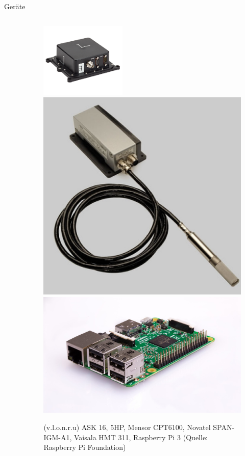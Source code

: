 \documentclass[ucs,9pt]{beamer}
\begin{document}
\begin{frame}{Geräte}
\begin{columns}
\begin{column}[t]{0.45\textwidth}
\begin{figure}
			\end{figure}
		\end{column}
		\begin{column}[t]{0.45\textwidth}
			\begin{figure}
				\includegraphics[width=0.4\textwidth]{./docmedia/igm.png}
				\qquad
				\includegraphics[width=.4\textwidth]{./docmedia/hmt311.jpg}
				\qquad
				\includegraphics[width=\textwidth]{./docmedia/raspi.jpg}
				\caption{(v.l.o.n.r.u) ASK 16, 5HP, Mensor CPT6100, Novatel SPAN-IGM-A1, Vaisala HMT 311, Raspberry Pi 3 (Quelle: Raspberry Pi Foundation)}
			\end{figure}
		\end{column}
	\end{columns}
\end{frame}
\end{document}
